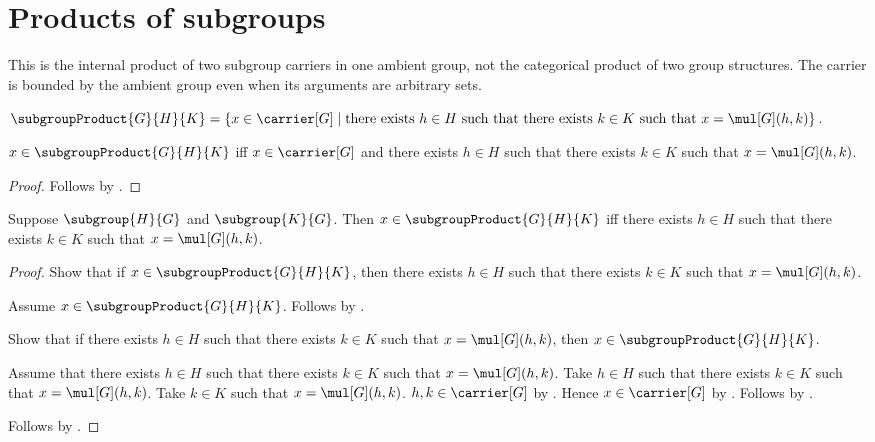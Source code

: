 

\section{Products of subgroups}

This is the internal product of two subgroup carriers in one ambient group,
not the categorical product of two group structures.  The carrier is bounded
by the ambient group even when its arguments are arbitrary sets.

\begin{definition}\label{subgroup_product}
    $\subgroupProduct{G}{H}{K}=
        \{x\in\carrier[G]\mid
            \text{there exists $h\in H$ such that there exists
                $k\in K$ such that $x=\mul[G](h,k)$}\}$.
\end{definition}

\begin{proposition}\label{subgroup_product_iff}
    $x\in\subgroupProduct{G}{H}{K}$ iff
        $x\in\carrier[G]$ and there exists $h\in H$ such that
            there exists $k\in K$ such that $x=\mul[G](h,k)$.
\end{proposition}
\begin{proof}
    Follows by .
\end{proof}

\begin{proposition}\label{subgroup_product_iff_for_subgroups}
    Suppose $\subgroup{H}{G}$ and $\subgroup{K}{G}$.
    Then $x\in\subgroupProduct{G}{H}{K}$ iff
        there exists $h\in H$ such that there exists $k\in K$ such that
            $x=\mul[G](h,k)$.
\end{proposition}
\begin{proof}
    Show that if $x\in\subgroupProduct{G}{H}{K}$, then
        there exists $h\in H$ such that there exists $k\in K$ such that
            $x=\mul[G](h,k)$.
    \begin{subproof}
        Assume $x\in\subgroupProduct{G}{H}{K}$.
        Follows by .
    \end{subproof}
    Show that if there exists $h\in H$ such that there exists $k\in K$
        such that $x=\mul[G](h,k)$, then
        $x\in\subgroupProduct{G}{H}{K}$.
    \begin{subproof}
        Assume that there exists $h\in H$ such that there exists $k\in K$
            such that $x=\mul[G](h,k)$.
        Take $h\in H$ such that there exists $k\in K$ such that
            $x=\mul[G](h,k)$.
        Take $k\in K$ such that $x=\mul[G](h,k)$.
        $h,k\in\carrier[G]$ by
            .
        Hence $x\in\carrier[G]$ by
            .
        Follows by .
    \end{subproof}
    Follows by \auto.
\end{proof}

